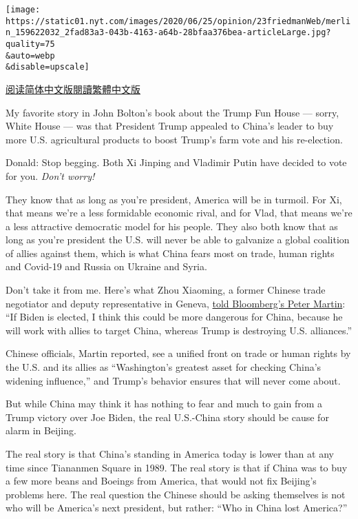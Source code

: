 \texttt{[image: https://static01.nyt.com/images/2020/06/25/opinion/23friedmanWeb/merlin\_159622032\_2fad83a3-043b-4163-a64b-28bfaa376bea-articleLarge.jpg?quality=75\\\&auto=webp\\\&disable=upscale]}

\href{https://cn.nytimes.com/opinion/20200624/china-united-states-trump/}{阅读简体中文版}\href{https://cn.nytimes.com/opinion/20200624/china-united-states-trump/zh-hant/}{閱讀繁體中文版}

My favorite story in John Bolton's book about the Trump Fun House ---
sorry, White House --- was that President Trump appealed to China's
leader to buy more U.S. agricultural products to boost Trump's farm vote
and his re-election.

Donald: Stop begging. Both Xi Jinping and Vladimir Putin have decided to
vote for you. \emph{Don't worry!}

They know that as long as you're president, America will be in turmoil.
For Xi, that means we're a less formidable economic rival, and for Vlad,
that means we're a less attractive democratic model for his people. They
also both know that as long as you're president the U.S. will never be
able to galvanize a global coalition of allies against them, which is
what China fears most on trade, human rights and Covid-19 and Russia on
Ukraine and Syria.

Don't take it from me. Here's what Zhou Xiaoming, a former Chinese trade
negotiator and deputy representative in Geneva,
\href{https://www.bloomberg.com/news/articles/2020-06-15/china-warms-to-idea-of-four-more-years-of-trump-presidency}{told
Bloomberg's Peter Martin}: ``If Biden is elected, I think this could be
more dangerous for China, because he will work with allies to target
China, whereas Trump is destroying U.S. alliances.''

Chinese officials, Martin reported, see a unified front on trade or
human rights by the U.S. and its allies as ``Washington's greatest asset
for checking China's widening influence,'' and Trump's behavior ensures
that will never come about.

But while China may think it has nothing to fear and much to gain from a
Trump victory over Joe Biden, the real U.S.-China story should be cause
for alarm in Beijing.

The real story is that China's standing in America today is lower than
at any time since Tiananmen Square in 1989. The real story is that if
China was to buy a few more beans and Boeings from America, that would
not fix Beijing's problems here. The real question the Chinese should be
asking themselves is not who will be America's next president, but
rather: ``Who in China lost America?''

